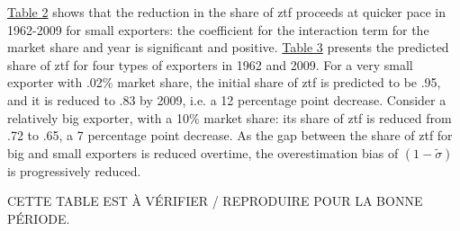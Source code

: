 \documentclass[12pt,twoside,a4paper,notitlepage]{article}
\begin{document}
{{\hyperref[ref-005]{Table 2}} shows that the reduction in the share of ztf proceeds at quicker pace in 1962-2009 for small exporters: the coefficient for the interaction term for the market share and year is significant and positive. {\hyperref[ref-006]{Table 3}} presents the predicted share of ztf for four types of exporters in 1962 and 2009. For a very small exporter with .02\% market share, the initial share of ztf is predicted to be .95, and it is reduced to .83 by 2009, i.e. a 12 percentage point decrease. Consider a relatively big exporter, with a 10\% market share: its share of ztf is reduced from .72 to .65, a 7 percentage point decrease. As the gap between the share of ztf for big and small exporters is reduced overtime, the overestimation bias of $(1-\tilde{\sigma })$ is progressively reduced.

 
CETTE TABLE EST À VÉRIFIER / REPRODUIRE POUR LA BONNE PÉRIODE.

}
\end{document}
